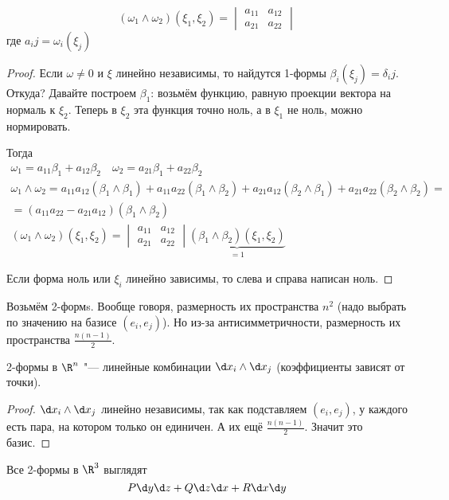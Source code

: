 \begin{theorem}
	\[ (\omega_1 \wedge \omega_2)(\xi_1, \xi_2) = \begin{vmatrix} a_11 & a_12 \\ a_21 & a_22 \end{vmatrix} \]
	где $a_ij = \omega_i(\xi_j)$
\end{theorem}
\begin{proof}
	Если $\omega \ne 0$ и $\xi$ линейно независимы, то найдутся 1-формы $\beta_i(\xi_j) = \delta_ij$.
	Откуда?
	Давайте построем $\beta_1$: возьмём функцию, равную проекции вектора на нормаль к $\xi_2$.
	Теперь в $\xi_2$ эта функция точно ноль, а в $\xi_1$ не ноль, можно нормировать.

	Тогда
	\begin{gather*}
		\omega_1 = a_11 \beta_1 + a_12 \beta_2 \quad \omega_2 = a_21 \beta_1 + a_22 \beta_2 \\
		\omega_1 \wedge \omega_2
		= a_11 a_12 (\beta_1 \wedge \beta_1)
		+ a_11 a_22 (\beta_1 \wedge \beta_2)
		+ a_21 a_12 (\beta_2 \wedge \beta_1)
		+ a_21 a_22 (\beta_2 \wedge \beta_2) = \\
		= (a_11 a_22 - a_21 a_12) (\beta_1 \wedge \beta_2) \\
		(\omega_1 \wedge \omega_2) (\xi_1, \xi_2)
		= \begin{vmatrix} a_11 & a_12 \\ a_21 & a_22 \end{vmatrix} \underbrace{(\beta_1 \wedge \beta_2) (\xi_1, \xi_2)}_{=1}
	\end{gather*}

	Если форма ноль или $\xi_i$ линейно зависимы, то слева и справа написан ноль.
\end{proof}

\begin{Rem}
	Возьмём 2-формs.
	Вообще говоря, размерность их пространства $n^2$ (надо выбрать по значению на базисе $(e_i, e_j)$).
	Но из-за антисимметричности, размерность их пространства $\frac{n(n-1)}2$.
\end{Rem}

\begin{theorem}
	2-формы в $\R^n$ "--- линейные комбинации $\d x_i \wedge \d x_j$ (коэффициенты зависят от точки).
\end{theorem}
\begin{proof}
	$\d x_i \wedge \d x_j$ линейно независимы, так как подставляем $(e_i, e_j)$, у каждого есть пара, на котором только он единичен.
	А их ещё $\frac{n(n-1)}2$.
	Значит это базис.
\end{proof}

\begin{conseq}
	Все 2-формы в $\R^3$ выглядят
	\[ P \d y \d z + Q \d z \d x + R \d x \d y \]
\end{conseq}
